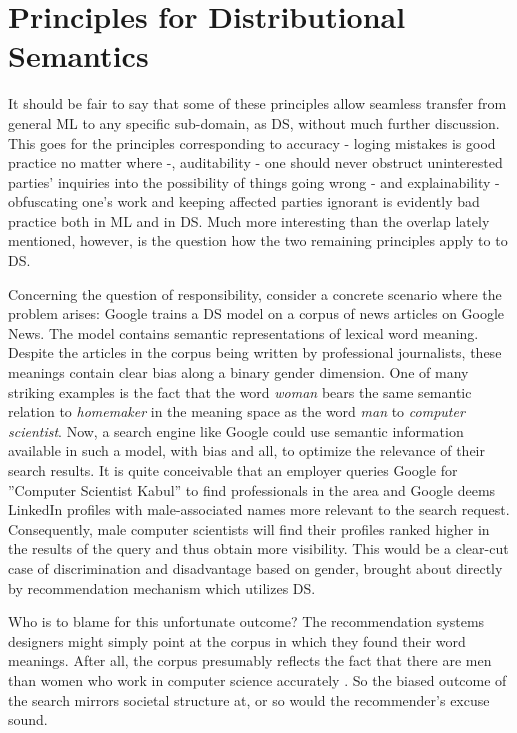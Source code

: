 \documentclass{article}
\begin{document}
\section{Principles for Distributional Semantics}\hypertarget{sec x}{}
It should be fair to say that some of these principles allow seamless transfer from general ML to any specific sub-domain, as DS, without much further discussion.
This goes for the principles corresponding to accuracy - loging mistakes is good practice no matter where -, auditability - one should never obstruct uninterested parties' inquiries into the possibility of things going wrong - and explainability - obfuscating one's work and keeping affected parties ignorant is evidently bad practice both in ML and in DS.
Much more interesting than the overlap lately mentioned, however, is the question how the two remaining principles apply to to DS.

Concerning the question of responsibility, consider a concrete scenario where the problem arises: Google trains a DS model on a corpus of news articles on Google News. The model contains semantic representations of lexical word meaning. Despite the articles in the corpus being written by professional journalists, these meanings contain clear bias along a binary gender dimension. One of many striking examples is the fact that the word \emph{woman} bears the same semantic relation to \emph{homemaker} in the meaning space as the word \emph{man} to \emph{computer scientist}. Now, a search engine like Google could use semantic information available in such a model, with bias and all, to optimize the relevance of their search results. It is quite conceivable that an employer queries Google for ''Computer Scientist Kabul'' to find professionals in the area and Google deems LinkedIn profiles with male-associated names more relevant to the search request. Consequently, male computer scientists will find their profiles ranked higher in the results of the query and thus obtain more visibility. This would be a clear-cut case of discrimination and disadvantage based on gender, brought about directly by recommendation mechanism which utilizes DS.

Who is to blame for this unfortunate outcome? The recommendation systems designers might simply point at the corpus in which they found their word meanings. After all, the corpus presumably reflects the fact that there are men than women who work in computer science accurately \cite{womenincs}. So the biased outcome of the search mirrors societal structure at, or so would the recommender's excuse sound. 
\end{document}

